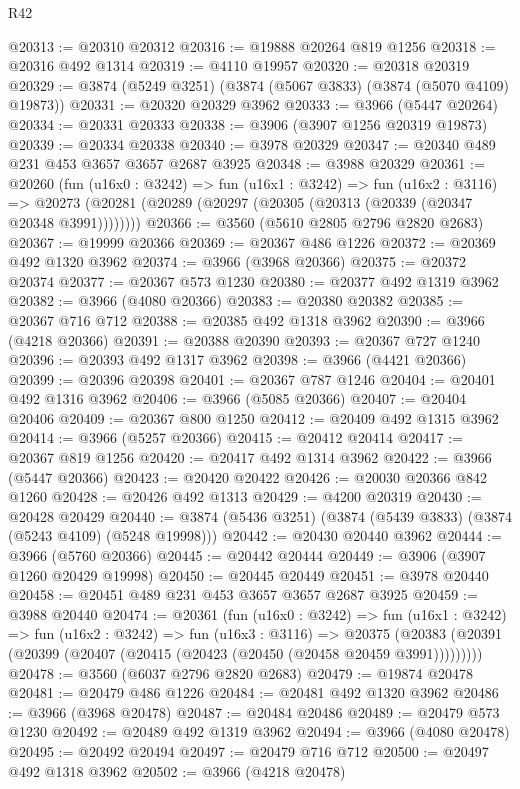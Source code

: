 \begin{lexlean}{R42}
\begin{coremodule}
@20313 := @20310 @20312
@20316 := @19888 @20264 @819 @1256
@20318 := @20316 @492 @1314
@20319 := @4110 @19957
@20320 := @20318 @20319
@20329 := @3874 (@5249 @3251) (@3874 (@5067 @3833) (@3874 (@5070 @4109) @19873))
@20331 := @20320 @20329 @3962
@20333 := @3966 (@5447 @20264)
@20334 := @20331 @20333
@20338 := @3906 (@3907 @1256 @20319 @19873)
@20339 := @20334 @20338
@20340 := @3978 @20329
@20347 := @20340 @489 @231 @453 @3657 @3657 @2687 @3925
@20348 := @3988 @20329
@20361 := @20260
    (fun (u16x0 : @3242) =>
    fun (u16x1 : @3242) =>
    fun (u16x2 : @3116) =>
    @20273 (@20281 (@20289 (@20297 (@20305 (@20313 (@20339 (@20347 @20348 @3991))))))))
@20366 := @3560 (@5610 @2805 @2796 @2820 @2683)
@20367 := @19999 @20366
@20369 := @20367 @486 @1226
@20372 := @20369 @492 @1320 @3962
@20374 := @3966 (@3968 @20366)
@20375 := @20372 @20374
@20377 := @20367 @573 @1230
@20380 := @20377 @492 @1319 @3962
@20382 := @3966 (@4080 @20366)
@20383 := @20380 @20382
@20385 := @20367 @716 @712
@20388 := @20385 @492 @1318 @3962
@20390 := @3966 (@4218 @20366)
@20391 := @20388 @20390
@20393 := @20367 @727 @1240
@20396 := @20393 @492 @1317 @3962
@20398 := @3966 (@4421 @20366)
@20399 := @20396 @20398
@20401 := @20367 @787 @1246
@20404 := @20401 @492 @1316 @3962
@20406 := @3966 (@5085 @20366)
@20407 := @20404 @20406
@20409 := @20367 @800 @1250
@20412 := @20409 @492 @1315 @3962
@20414 := @3966 (@5257 @20366)
@20415 := @20412 @20414
@20417 := @20367 @819 @1256
@20420 := @20417 @492 @1314 @3962
@20422 := @3966 (@5447 @20366)
@20423 := @20420 @20422
@20426 := @20030 @20366 @842 @1260
@20428 := @20426 @492 @1313
@20429 := @4200 @20319
@20430 := @20428 @20429
@20440 := @3874 (@5436 @3251) (@3874 (@5439 @3833) (@3874 (@5243 @4109) (@5248 @19998)))
@20442 := @20430 @20440 @3962
@20444 := @3966 (@5760 @20366)
@20445 := @20442 @20444
@20449 := @3906 (@3907 @1260 @20429 @19998)
@20450 := @20445 @20449
@20451 := @3978 @20440
@20458 := @20451 @489 @231 @453 @3657 @3657 @2687 @3925
@20459 := @3988 @20440
@20474 := @20361
    (fun (u16x0 : @3242) =>
    fun (u16x1 : @3242) =>
    fun (u16x2 : @3242) =>
    fun (u16x3 : @3116) =>
    @20375 (@20383 (@20391 (@20399 (@20407 (@20415 (@20423 (@20450 (@20458 @20459 @3991)))))))))
@20478 := @3560 (@6037 @2796 @2820 @2683)
@20479 := @19874 @20478
@20481 := @20479 @486 @1226
@20484 := @20481 @492 @1320 @3962
@20486 := @3966 (@3968 @20478)
@20487 := @20484 @20486
@20489 := @20479 @573 @1230
@20492 := @20489 @492 @1319 @3962
@20494 := @3966 (@4080 @20478)
@20495 := @20492 @20494
@20497 := @20479 @716 @712
@20500 := @20497 @492 @1318 @3962
@20502 := @3966 (@4218 @20478)

\end{coremodule}
\end{lexlean}

